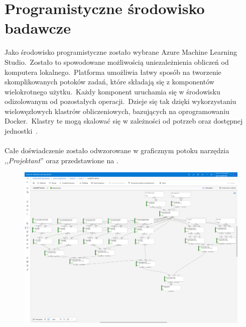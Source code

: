 \section{Programistyczne środowisko badawcze}
Jako środowisko programistyczne zostało wybrane Azure Machine Learning Studio.\ Zostało to spowodowane możliwością uniezależnienia obliczeń od komputera lokalnego.\ Platforma umożliwia łatwy sposób na tworzenie skomplikowanych potoków zadań, które składają się z komponentów wielokrotnego użytku.\ Każdy komponent uruchamia się w środowisku odizolowanym od pozostałych operacji.\ Dzieje się tak dzięki wykorzystaniu wielowęzłowych klastrów obliczeniowych, bazujących na oprogramowaniu Docker.\ Klastry te mogą skalować się w zależności od potrzeb oraz dostępnej jednostki~\cite{MicrosoftLearn2023}.
\\ \\
Całe doświadczenie zostało odwzorowane w graficznym potoku narzędzia ,,\textit{Projektant}'' oraz przedstawione na .

\begin{landscape}
    \centering
\begin{figure}[H]
    \centering
    \includegraphics[height=0.9\textwidth]{images/pipeline}
    \label{fig:pipeline}
\end{figure}
\end{landscape}

